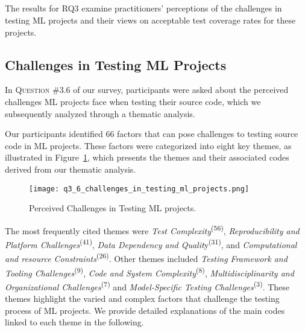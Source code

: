 \subsection*{\textbf{\RQthree}}

The results for RQ3 examine practitioners' perceptions of the challenges in testing ML projects and their views on acceptable test coverage rates for these projects.

\subsection*{\textbf{Challenges in Testing ML Projects}}

In \textsc{Question \#3.6} of our survey, participants were asked about the perceived challenges ML projects face when testing their source code, which we subsequently analyzed through a thematic analysis. 

Our participants identified 66 factors that can pose challenges to testing source code in ML projects.
These factors were categorized into eight key themes, as illustrated in
Figure~\ref{fig:q3_6_challenges_in_testing_ml_projects}, which presents the themes and their associated codes derived from our thematic analysis.

\begin{figure}
	\centering
	\texttt{[image: q3\_6\_challenges\_in\_testing\_ml\_projects.png]}
	\caption{Perceived Challenges in Testing ML projects.}
	\label{fig:q3_6_challenges_in_testing_ml_projects}       %
\end{figure}

The most frequently cited themes were \textit{Test Complexity}\textsuperscript{(56)}, \textit{Reproducibility and Platform Challenges}\textsuperscript{(41)}, \textit{Data Dependency and Qualit}y\textsuperscript{(31)}, and \textit{Computational and resource Constraints}\textsuperscript{(26)}. Other themes included
\textit{Testing Framework and Tooling Challenges}\textsuperscript{(9)},
\textit{Code and System Complexity}\textsuperscript{(8)},
\textit{Multidisciplinarity and Organizational Challenges}\textsuperscript{(7)} and
\textit{Model-Specific Testing Challenges}\textsuperscript{(3)}. These themes highlight the varied and complex factors that challenge the testing process of ML projects. 
We provide detailed explanations of the main codes linked to each theme in the following.


